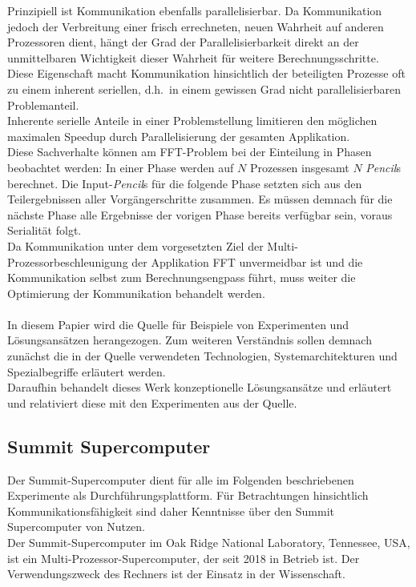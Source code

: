Prinzipiell ist Kommunikation ebenfalls parallelisierbar. Da Kommunikation jedoch der Verbreitung einer frisch errechneten, neuen Wahrheit auf anderen Prozessoren dient, hängt der Grad der Parallelisierbarkeit direkt an der unmittelbaren Wichtigkeit dieser Wahrheit für weitere Berechnungsschritte.\\
Diese Eigenschaft macht Kommunikation hinsichtlich der beteiligten Prozesse oft zu einem inherent seriellen, d.h.~in einem gewissen Grad nicht parallelisierbaren Problemanteil.\\
Inherente serielle Anteile in einer Problemstellung limitieren den möglichen maximalen Speedup durch Parallelisierung der gesamten Applikation.\\
Diese Sachverhalte können am FFT-Problem bei der Einteilung in Phasen beobachtet werden: In einer Phase werden auf $N$ Prozessen insgesamt $N$ \textit{Pencil}s berechnet. Die Input-\textit{Pencil}s für die folgende Phase setzten sich aus den Teilergebnissen aller Vorgängerschritte zusammen. Es müssen demnach für die nächste Phase alle Ergebnisse der vorigen Phase bereits verfügbar sein, voraus Serialität folgt.\\
Da Kommunikation unter dem vorgesetzten Ziel der Multi-Prozessorbeschleunigung der Applikation FFT unvermeidbar ist und die Kommunikation selbst zum Berechnungsengpass führt, muss weiter die Optimierung der Kommunikation behandelt werden.\\
\\
In diesem Papier wird die Quelle \cite{mainpaper} für Beispiele von Experimenten und Lösungsansätzen herangezogen. Zum weiteren Verständnis sollen demnach zunächst die in der Quelle verwendeten Technologien, Systemarchitekturen und Spezialbegriffe erläutert werden.\\
Daraufhin behandelt dieses Werk konzeptionelle Lösungsansätze und erläutert und relativiert diese mit den Experimenten aus der Quelle.


\subsection{Summit Supercomputer}
Der Summit-Supercomputer dient für alle im Folgenden beschriebenen Experimente als Durchführungsplattform. Für Betrachtungen hinsichtlich Kommunikationsfähigkeit sind daher Kenntnisse über den Summit Supercomputer von Nutzen.\\

Der Summit-Supercomputer im Oak Ridge National Laboratory, Tennessee, USA, ist ein Multi-Prozessor-Supercomputer, der seit 2018 in Betrieb ist. Der Verwendungszweck des Rechners ist der Einsatz in der Wissenschaft.

